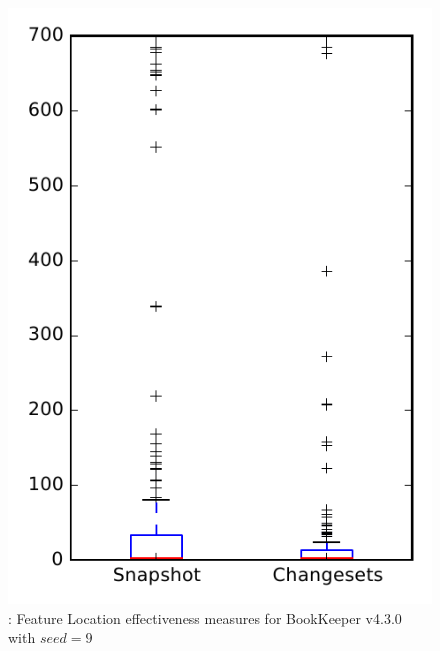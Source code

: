 
\begin{figure}
\centering
\includegraphics[height=0.4\textheight]{figures/flt_seed/rq1_bookkeeper_9}
\caption{\rone: Feature Location effectiveness measures for BookKeeper v4.3.0 with $seed=9$}
\label{fig:flt_seed:rq1:bookkeeper}
\end{figure}
